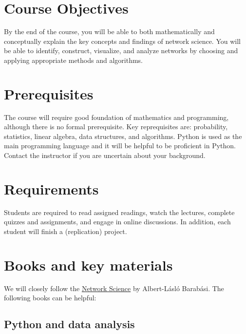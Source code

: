 \documentclass[11pt,article,oneside]{memoir}
\begin{document}
\section{Course Objectives}

By the end of the course, you will be able to both mathematically and
conceptually explain the key concepts and findings of network science. You will
be able to identify, construct, visualize, and analyze networks by choosing and
applying appropriate methods and algorithms.   

\section{Prerequisites}
\label{sec:Prerequisites}

The course will require good foundation of mathematics and programming,
although there is no formal prerequisite. Key reprequisites are: probability,
statistics, linear algebra, data structures, and algorithms. Python is used as
the main programming language and it will be helpful to be proficient in
Python. Contact the instructor if you are uncertain about your background.

\section{Requirements}
\label{sec:requirements}

Students are required to read assigned readings, watch the lectures, complete
quizzes and assignments, and engage in online discussions. In addition, each
student will finish a (replication) project. 

\section{Books and key materials}

We will closely follow the
\href{http://barabasi.com/networksciencebook/}{Network Science} by Albert-Lásló
Barabási. The following books can be helpful:

\subsection{Python and data analysis}
\end{document}
